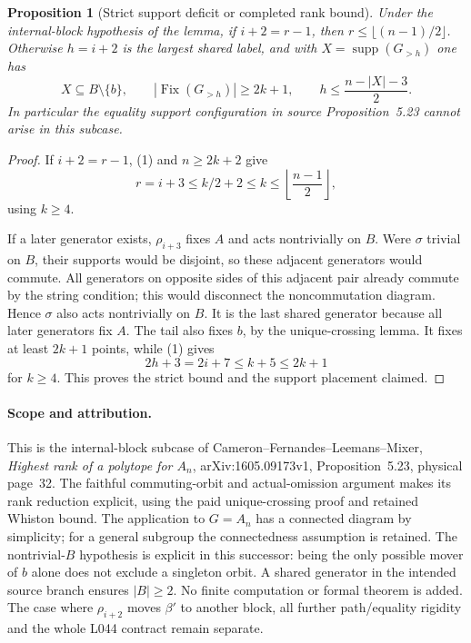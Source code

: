 \documentclass[11pt,a4paper]{article}
\newtheorem{proposition}[lemma]{Proposition}
\begin{document}
\begin{proposition}[Strict support deficit or completed rank bound]
Under the internal-block hypothesis of the lemma, if
$i+2=r-1$, then $r\leq\lfloor(n-1)/2\rfloor$.
Otherwise $h=i+2$ is the largest shared label, and with
$X=\operatorname{supp}(G_{>h})$ one has
\[
 X\subseteq B\setminus\{b\},\qquad
 |\operatorname{Fix}(G_{>h})|\geq2k+1,\qquad
 h\leq\frac{n-|X|-3}{2}.
\]
In particular the equality support configuration in source
Proposition~5.23 cannot arise in this subcase.
\end{proposition}
\begin{proof}
If $i+2=r-1$, (1) and $n\geq2k+2$ give
\[
 r=i+3\leq k/2+2\leq k\leq\left\lfloor\frac{n-1}{2}\right\rfloor,
\]
using $k\geq4$.

If a later generator exists, $\rho_{i+3}$ fixes $A$ and acts
nontrivially on $B$. Were $\sigma$ trivial on $B$, their
supports would be disjoint, so these adjacent generators
would commute. All generators on opposite sides of this
adjacent pair already commute by the string condition;
this would disconnect the noncommutation diagram. Hence
$\sigma$ also acts nontrivially on $B$. It is the last
shared generator because all later generators fix $A$.
The tail also fixes $b$, by the unique-crossing lemma.
It fixes at least $2k+1$ points, while (1) gives
\[
                        2h+3=2i+7\leq k+5\leq2k+1
\]
for $k\geq4$. This proves the strict bound and the support
placement claimed.
\end{proof}

\paragraph{Scope and attribution.}
This is the internal-block subcase of Cameron--Fernandes--Leemans--Mixer,
\emph{Highest rank of a polytope for $A_n$}, arXiv:1605.09173v1,
Proposition~5.23, physical page~32. The faithful commuting-orbit
and actual-omission argument makes its rank reduction explicit,
using the paid unique-crossing proof and retained Whiston bound.
The application to $G=A_n$ has a connected diagram by simplicity;
for a general subgroup the connectedness assumption is retained.
The nontrivial-$B$ hypothesis is explicit in this successor: being the
only possible mover of $b$ alone does not exclude a singleton orbit.
A shared generator in the intended source branch ensures $|B|\geq2$.
No finite computation or formal theorem is added. The case where
$\rho_{i+2}$ moves $\beta'$ to another block, all further
path/equality rigidity and the whole L044 contract remain separate.
\end{document}
